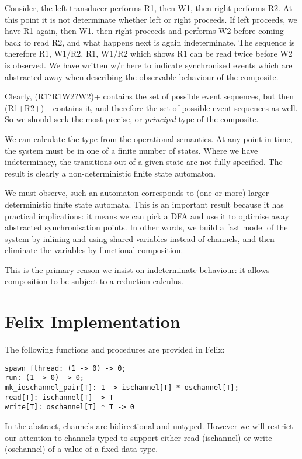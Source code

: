 \documentclass[oneside]{book}
\begin{document}
Consider, the left transducer performs R1, then W1, then right
performs R2. At this point it is not determinate whether left
or right proceeds. If left proceeds, we have R1 again, then W1.
then right proceeds and performs W2 before coming back to read R2,
and what happens next is again indeterminate. The sequence is
therefore R1, W1/R2, R1, W1/R2 which shows R1 can be read twice
before W2 is observed. We have written w/r here to indicate synchronised
events which are abstracted away when describing the observable
behaviour of the composite.

Clearly, (R1?R1W2?W2)+ contains the set of possible event sequences,
but then (R1+R2+)+ contains it, and therefore the set of possible
event sequences as well. So we should seek the most precise, or
{\em principal} type of the composite.

We can calculate the type from the operational semantics.
At any point in time, the system must be in one of a finite
number of states. Where we have indeterminacy, the transitions
out of a given state are not fully specified. The result is
clearly a non-deterministic finite state automaton.

We must observe, such an automaton corresponds to (one or more) 
larger deterministic finite state automata. This is an important
result because it has practical implications: it means we can
pick a DFA and use it to optimise away abstracted synchronisation
points. In other words, we build a fast model of the system
by inlining and using shared variables instead of channels,
and then eliminate the variables by functional composition.

This is the primary reason we insist on indeterminate behaviour:
it allows composition to be subject to a reduction calculus.

\section{Felix Implementation}
The following functions and procedures are provided in Felix:

\begin{verbatim}
spawn_fthread: (1 -> 0) -> 0;
run: (1 -> 0) -> 0;
mk_ioschannel_pair[T]: 1 -> ischannel[T] * oschannel[T];
read[T]: ischannel[T] -> T
write[T]: oschannel[T] * T -> 0
\end{verbatim}

In the abstract, channels are bidirectional and untyped.
However we will restrict our attention to channels
typed to support either read (ischannel) or write (oschannel)
of a value of a fixed data type.
\end{document}
